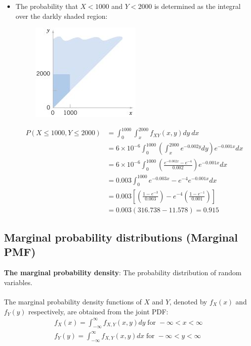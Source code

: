 \documentclass[10pt,a4paper]{article}
\begin{document}
\begin{itemize}
    \item The probability that $X<1000$ and $Y<2000$ is determined as the integral over the darkly
    shaded region:
    \begin{figure} [h!]
        \centering
        \includegraphics[scale=0.7]{Ex1a.JPG}
    \end{figure}
    \begin{align*}
        P(X\leq 1000, Y \leq 2000) &= \int_0^{1000} \int_x^{2000} f_{XY}(x,y) dy\:dx \\
        &= 6 \times 10^{-6} \int_0^{1000} \left(\int_x^{2000}e^{-0.002y}dy\right)e^{-0.001x} dx \\
        &= 6 \times 10^{-6} \int_0^{1000} \left(\frac{e^{-0.002x}-e^{-4}}{0.002}\right)e^{-0.001x}dx \\
        &= 0.003 \int_0^{1000} e^{-0.003x} - e^{-4}e^{-0.001x}dx \\
        &= 0.003 \left[\left(\frac{1-e^{-3}}{0.003}\right)-e^{-4}\left(\frac{1-e^{-1}}{0.001}\right)\right] \\
        &= 0.003(316.738 - 11.578) = 0.915
    \end{align*}
\end{itemize}

\subsection{Marginal probability distributions (Marginal PMF)}

\begin{tcolorbox}[breakable,colback=white]
\textbf{The marginal probability density}: The probability distribution of random variables.
\\
\\
The marginal probability density functions of $X$ and $Y$, denoted by $f_X(x)$ and $f_Y(y)$ respectively, are obtained from the joint PDF:
\begin{align*}
    f_X(x) = \int_{-\infty}^{\infty} f_{X,Y}(x,y)dy \; \text{for } -\infty < x < \infty \\
    f_Y(y) = \int_{-\infty}^{\infty} f_{X,Y}(x,y)dx \; \text{for } -\infty < y < \infty 
\end{align*}
\end{tcolorbox}
\end{document}
